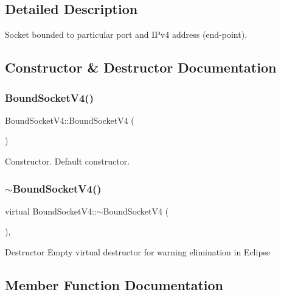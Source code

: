 \subsection{Detailed Description}
Socket bounded to particular port and I\+Pv4 address (end-\/point). 

\subsection{Constructor \& Destructor Documentation}
\mbox{\label{classBoundSocketV4_a6de624ded6ab107a35c5420bacaa75ae}} 
\subsubsection{\texorpdfstring{Bound\+Socket\+V4()}{BoundSocketV4()}}
{\footnotesize\ttfamily Bound\+Socket\+V4\+::\+Bound\+Socket\+V4 (\begin{DoxyParamCaption}{ }\end{DoxyParamCaption})}

Constructor. Default constructor. \mbox{\label{classBoundSocketV4_a4cdcca1dc8bdcf1af76ac34fe07bc84f}} 
\subsubsection{\texorpdfstring{$\sim$\+Bound\+Socket\+V4()}{~BoundSocketV4()}}
{\footnotesize\ttfamily virtual Bound\+Socket\+V4\+::$\sim$\+Bound\+Socket\+V4 (\begin{DoxyParamCaption}{ }\end{DoxyParamCaption})\hspace{0.3cm}{\ttfamily [inline]}, {\ttfamily [virtual]}}

Destructor Empty virtual destructor for warning elimination in Eclipse 

\subsection{Member Function Documentation}
\mbox{\label{classBoundSocketV4_ad7165f6b77c9c813352179fcf3910b54}} 
